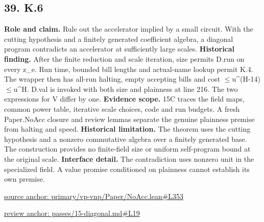 \documentclass[11pt,letterpaper]{article}
\theoremstyle{definition}\newtheorem{definition}[theorem]{Definition}\newtheorem{example}[theorem]{Example}
\theoremstyle{remark}\newtheorem{remark}[theorem]{Remark}
\begin{document}
\subsection*{39. K.6}
\textbf{Role and claim.} Rule out the accelerator implied by a small circuit. With the cutting hypothesis and a finitely generated coefficient algebra, a diagonal program contradicts an accelerator at sufficiently large scales.
\textbf{Historical finding.} After the finite reduction and scale iteration, size permits D.run on every z\_e. Run time, bounded bill lengths and actual-name lookup permit K.4. The wrapper then has all-run halting, empty accepting bills and cost \ensuremath{\le}u\textasciicircum{}(H-14)\ensuremath{\le}u\textasciicircum{}H. D.val is invoked with both size and plainness at line 216. The two expressions for V differ by one.
\textbf{Evidence scope.} 15C traces the field maps, common power table, iterative scale choices, code and run budgets. A fresh Paper.NoAcc closure and review lemmas separate the genuine plainness premise from halting and speed.
\textbf{Historical limitation.} The theorem uses the cutting hypothesis and a nonzero commutative algebra over a finitely generated base. The construction provides no finite-field size or uniform self-program bound at the original scale.
\textbf{Interface detail.} The contradiction uses nonzero unit in the specialized field. A value promise conditioned on plainness cannot establish its own premise.
\par\href{https://github.com/nousentllc/VP-VNP-Review/blob/8a7976933b6b2b4ffda1ad3a0dfb5fc6b6f023e8/primary/vp-vnp/Paper/NoAcc.lean\#L353}{source anchor: primary/vp-vnp/Paper/NoAcc.lean\#L353}
\par\href{https://github.com/nousentllc/VP-VNP-Review/blob/8a7976933b6b2b4ffda1ad3a0dfb5fc6b6f023e8/passes/15-diagonal.md\#L19}{review anchor: passes/15-diagonal.md\#L19}
\goodbreak
{}
\hypertarget{claim.40}{}
\end{document}
